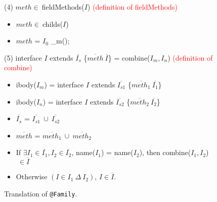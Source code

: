 \begin{figure*}
(4) $meth\in\ $\textsf{fieldMethods(}$I$\textsf{)} \textcolor{red}{(definition of fieldMethods)}
    \begin{itemize}
    \item $meth\in\ $\textsf{childs(}$I$\textsf{)}
    \item $meth$ = $I_0$\textsf{ \_m();}
    \end{itemize}
(5) \textsf{interface }$I$\textsf{ extends }$\overline{I_s}$\textsf{ \{}$\overline{meth}\ \overline{I}$\textsf{\}} = \textsf{combine(}$I_m,I_n$\textsf{)} \textcolor{red}{(definition of combine)}
    \begin{itemize}
    \item \textsf{ibody(}$I_m$\textsf{)} = \textsf{interface }$I$\textsf{ extends }$\overline{I_{s1}}$\textsf{ \{}$\overline{meth_1}\ \overline{I_1}$\textsf{\}}
    \item \textsf{ibody(}$I_n$\textsf{)} = \textsf{interface }$I$\textsf{ extends }$\overline{I_{s2}}$\textsf{ \{}$\overline{meth_2}\ \overline{I_2}$\textsf{\}}
    \item $\overline{I_s}$ = $\overline{I_{s1}}\ \cup\ \overline{I_{s2}}$
    \item $\overline{meth}$ = $\overline{meth_1}\ \cup\ \overline{meth_2}$
    \item If $\exists I_1\in\overline{I_1}, I_2\in\overline{I_2}$, \textsf{name(}$I_1$\textsf{)} = \textsf{name(}$I_2$\textsf{)}, then \textsf{combine(}$I_1,I_2$\textsf{)}$\ \in\overline{I}$
    \item Otherwise $(I\in I_1\ \Delta\ I_2)$, $I\in\overline{I}$.
    \end{itemize}
\caption{Translation of \lstinline{@Family}.}
\label{fig:trans1}
\end{figure*}

